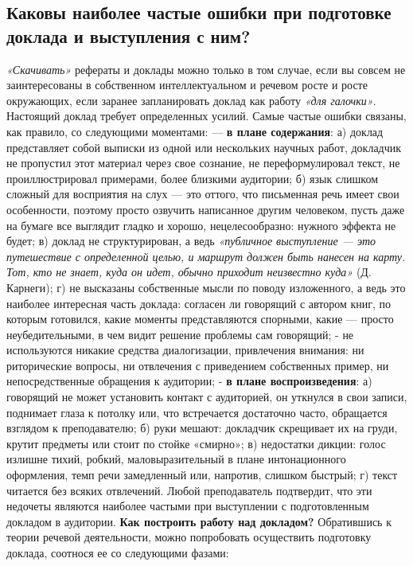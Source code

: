 \subsection*{Каковы наиболее частые ошибки при подготовке доклада и выступления с ним?}
\textit{ «Скачивать»} рефераты и доклады можно только в том случае, если вы совсем не заинтересованы в собственном интеллектуальном и речевом росте и росте окружающих, если заранее запланировать доклад как работу \textit{«для галочки»}.
Настоящий доклад требует определенных усилий. Самые частые ошибки связаны, как правило, со следующими моментами:
— \textbf{в плане содержания}: а) доклад представляет собой выписки из одной или нескольких научных работ, докладчик не пропустил этот материал через свое сознание, не переформулировал текст, не проиллюстрировал примерами, более близкими аудитории; б) язык слишком сложный для восприятия на слух — это оттого, что письменная речь имеет свои особенности, поэтому просто озвучить написанное другим человеком, пусть даже на бумаге все выглядит гладко и хорошо, нецелесообразно: нужного эффекта не будет; в) доклад не структурирован, а ведь \textit{«публичное выступление — это путешествие с определенной целью, и маршрут должен быть нанесен на карту. Тот, кто не знает, куда он идет, обычно приходит неизвестно куда»} (Д. Карнеги); г) не высказаны собственные мысли по поводу изложенного, а ведь это наиболее интересная часть доклада: согласен ли говорящий с автором книг, по которым готовился, какие моменты представляются спорными, какие — просто неубедительными, в чем видит решение проблемы сам говорящий; - не используются никакие средства диалогизации, привлечения внимания: ни риторические вопросы, ни отвлечения с приведением собственных пример, ни непосредственные обращения к аудитории;
-  \textbf{в плане воспроизведения}: а) говорящий не может установить контакт с аудиторией, он уткнулся в свои записи, поднимает глаза к потолку или, что встречается достаточно часто, обращается взглядом к преподавателю; б) руки мешают: докладчик скрещивает их на груди, крутит предметы или стоит по стойке «смирно»; в) недостатки дикции: голос излишне тихий, робкий, маловыразительный в плане интонационного оформления, темп речи замедленный или, напротив, слишком быстрый; г) текст читается без всяких отвлечений. Любой преподаватель подтвердит, что эти недочеты являются наиболее частыми при выступлении с подготовленным докладом в аудитории.
 \textbf{Как построить работу над докладом?}
Обратившись к теории речевой деятельности, можно попробовать осуществить подготовку доклада, соотнося ее со следующими фазами:
